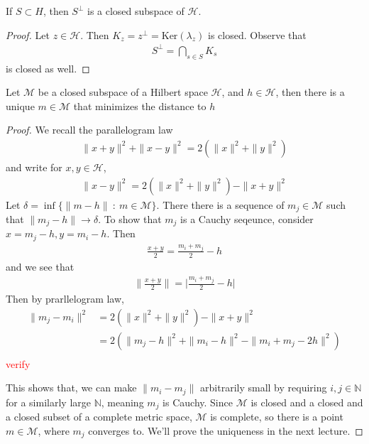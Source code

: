 \begin{theorem}
  If $S \subset H$, then $S^\perp$ is a closed subspace of $\mathcal{H}$.
\end{theorem}
\begin{proof}
  Let $z \in \mathcal{H}$. Then $K_z = z^\perp =
  \textrm{Ker}(\lambda_z)$ is closed. Observe that
  \begin{align*}
    S^\perp = \bigcap_{s \in S}K_s
  \end{align*}
  is closed as well.
\end{proof}

\begin{lemma}
  Let $\mathcal{M}$ be a closed subspace of a Hilbert space
  $\mathcal{H}$, and $h \in \mathcal{H}$, then there is a unique $m
  \in \mathcal{M}$ that minimizes the distance to $h$
\end{lemma}
\begin{proof}
  We recall the parallelogram law
  \begin{align*}
    \|x + y\|^2 + \|x -y\|^2 = 2 ( \|x\|^2 + \|y\|^2)
  \end{align*}
  and write for $x, y \in \mathcal{H}$,
  \begin{align*}
    \|x - y\|^2 = 2 (\|x\|^2 + \|y\|^2) - \|x + y\|^2
  \end{align*}
  Let $\delta = \inf \{ \|m - h\|  \ : \  m \in \mathcal{M}  \}$.
  There there is a sequence of $m_j \in \mathcal{M}$ such that $\|m_j
  - h\| \to \delta$. To show that $m_j$ is a Cauchy seqeunce,
  consider $x = m_j -h, y = m_i - h$. Then
  \begin{align*}
    \frac{x+y}{2} = \frac{m_i + m_j}{2} - h
  \end{align*}
  and we see that
  \begin{align*}
    \Big\|\frac{x+y}{2}\Big\| = \Big|\frac{m_i+m_j}{2} - h\Big|
  \end{align*}
  Then by prarllelogram law,
  \begin{align*}
    \|m_j - m_i\|^2 &= 2(\|x\|^2 + \|y\|^2) - \|x + y\|^2 \\
    &=2(\|m_j - h\|^2 + \|m_i - h\|^2 - \|m_i + m_j - 2h\|^2) \\
  \end{align*}
  \textcolor{red}{verify}

  This shows that, we can make $\|m_i - m_j\|$ arbitrarily small by
  requiring $ i, j \in \mathbb{N}$ for a similarly large
  $\mathbb{N}$, meaning $ m_j $ is Cauchy. Since $ \mathcal{M}$ is
  closed and a closed and a closed subset of a complete metric space,
  $\mathcal{M}$ is complete, so there is a point $m \in \mathcal{M}$,
  where $m_j$ converges to.
  We'll prove the uniqueness in the next lecture.
\end{proof}


